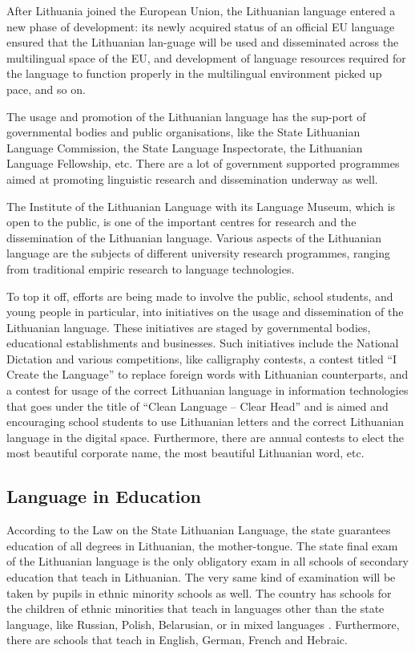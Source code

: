 \begin{multicols}{2}
    After Lithuania joined the European Union, the Lithuanian language entered a new phase of development: its newly acquired status of an official EU language ensured that the Lithuanian lan-guage will be used and disseminated across the multilingual space of the EU, and development of language resources required for the language to function properly in the multilingual environment picked up pace, and so on.

The usage and promotion of the Lithuanian language has the sup-port of governmental bodies and public organisations, like the State Lithuanian Language Commission, the State Language Inspectorate, the Lithuanian Language Fellowship, etc. There are a lot of government supported programmes aimed at promoting linguistic research and dissemination underway as well.

The Institute of the Lithuanian Language with its Language Museum, which is open to the public, is one of the important centres for research and the dissemination of the Lithuanian language. Various aspects of the Lithuanian language are the subjects of different university research programmes, ranging from traditional empiric research to language technologies.

To top it off, efforts are being made to involve the public, school students, and young people in particular, into initiatives on the usage and dissemination of the Lithuanian language. These initiatives are staged by governmental bodies, educational establishments and businesses. Such initiatives include the National Dictation and various competitions, like calligraphy contests, a contest titled “I Create the Language” to replace foreign words with Lithuanian counterparts, and a contest for usage of the correct Lithuanian language in information technologies that goes under the title of “Clean Language – Clear Head” and is aimed and encouraging school students to use Lithuanian letters and the correct Lithuanian language in the digital space. Furthermore, there are annual contests to elect the most beautiful corporate name, the most beautiful Lithuanian word, etc.

\subsection{Language in Education}

According to the Law on the State Lithuanian Language, the state guarantees education of all degrees in Lithuanian, the mother-tongue. The state final exam of the Lithuanian language is the only obligatory exam in all schools of secondary education that teach in Lithuanian. The very same kind of examination will be taken by pupils in ethnic minority schools as well. The country has schools for the children of ethnic minorities that teach in languages other than the state language, like Russian, Polish, Belarusian, or in mixed languages \cite{smm1}. Furthermore, there are schools that teach in English, German, French and Hebraic. 


\end{multicols}
